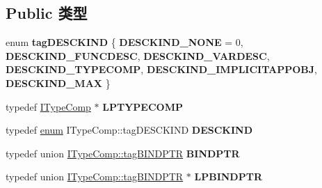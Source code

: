 \subsection*{Public 类型}
\begin{DoxyCompactItemize}
\item 
\mbox{\label{interface_i_type_comp_a5417fd1db9942af37faf84b2fa5c556c}} 
enum {\bfseries tag\+D\+E\+S\+C\+K\+I\+ND} \{ \newline
{\bfseries D\+E\+S\+C\+K\+I\+N\+D\+\_\+\+N\+O\+NE} = 0, 
{\bfseries D\+E\+S\+C\+K\+I\+N\+D\+\_\+\+F\+U\+N\+C\+D\+E\+SC}, 
{\bfseries D\+E\+S\+C\+K\+I\+N\+D\+\_\+\+V\+A\+R\+D\+E\+SC}, 
{\bfseries D\+E\+S\+C\+K\+I\+N\+D\+\_\+\+T\+Y\+P\+E\+C\+O\+MP}, 
\newline
{\bfseries D\+E\+S\+C\+K\+I\+N\+D\+\_\+\+I\+M\+P\+L\+I\+C\+I\+T\+A\+P\+P\+O\+BJ}, 
{\bfseries D\+E\+S\+C\+K\+I\+N\+D\+\_\+\+M\+AX}
 \}
\item 
\mbox{\label{interface_i_type_comp_a48db7c75df4c2a4570f3a75237acb740}} 
typedef \hyperlink{interface_i_type_comp}{I\+Type\+Comp} $\ast$ {\bfseries L\+P\+T\+Y\+P\+E\+C\+O\+MP}
\item 
\mbox{\label{interface_i_type_comp_a5b462eb9fba7d8d3f02efaefbbd9ccfe}} 
typedef \hyperlink{interfaceenum}{enum} I\+Type\+Comp\+::tag\+D\+E\+S\+C\+K\+I\+ND {\bfseries D\+E\+S\+C\+K\+I\+ND}
\item 
\mbox{\label{interface_i_type_comp_a713d523c854584093e6c42dcf7b2678d}} 
typedef union \hyperlink{union_i_type_comp_1_1tag_b_i_n_d_p_t_r}{I\+Type\+Comp\+::tag\+B\+I\+N\+D\+P\+TR} {\bfseries B\+I\+N\+D\+P\+TR}
\item 
\mbox{\label{interface_i_type_comp_ab5ec9fc12bc374f6bd1095d26a131b3a}} 
typedef union \hyperlink{union_i_type_comp_1_1tag_b_i_n_d_p_t_r}{I\+Type\+Comp\+::tag\+B\+I\+N\+D\+P\+TR} $\ast$ {\bfseries L\+P\+B\+I\+N\+D\+P\+TR}
\end{DoxyCompactItemize}
